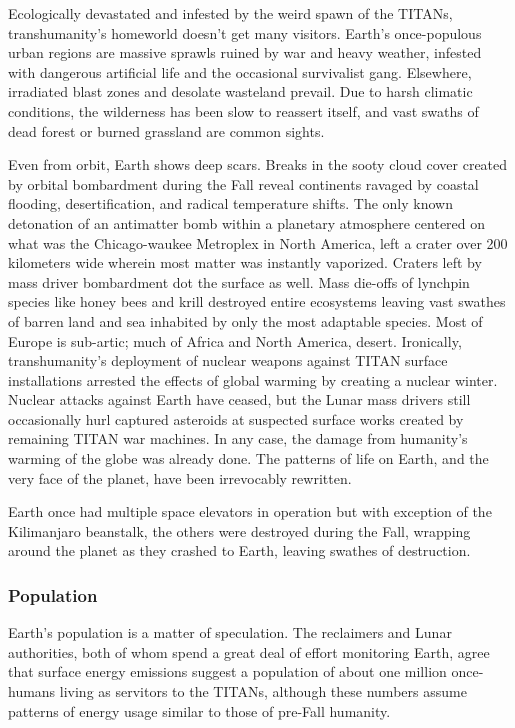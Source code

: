 Ecologically devastated and infested by the weird 
spawn of the TITANs, transhumanity's homeworld 
doesn't get many visitors. Earth's once-populous 
urban regions are massive sprawls ruined by war and 
heavy weather, infested with dangerous artificial life 
and the occasional survivalist gang. Elsewhere, irradiated
blast zones and desolate wasteland prevail. Due
to harsh climatic conditions, the wilderness has been 
slow to reassert itself, and vast swaths of dead forest 
or burned grassland are common sights.

Even from orbit, Earth shows deep scars. Breaks 
in the sooty cloud cover created by orbital bombardment
during the Fall reveal continents ravaged
by coastal flooding, desertification, and radical 
temperature shifts. The only known detonation 
of an antimatter bomb within a planetary atmosphere
centered on what was the Chicago-waukee
Metroplex in North America, left a crater over 200 
kilometers wide wherein most matter was instantly 
vaporized. Craters left by mass driver bombardment 
dot the surface as well. Mass die-offs of lynchpin 
species like honey bees and krill destroyed entire ecosystems
leaving vast swathes of barren land and sea
inhabited by only the most adaptable species. Most 
of Europe is sub-artic; much of Africa and North 
America, desert. Ironically, transhumanity's deployment
of nuclear weapons against TITAN surface
installations arrested the effects of global warming 
by creating a nuclear winter. Nuclear attacks against 
Earth have ceased, but the Lunar mass drivers still 
occasionally hurl captured asteroids at suspected 
surface works created by remaining TITAN war 
machines. In any case, the damage from humanity's 
warming of the globe was already done. The patterns 
of life on Earth, and the very face of the planet, have 
been irrevocably rewritten.

Earth once had multiple space elevators in operation
but with exception of the Kilimanjaro beanstalk,
the others were destroyed during the Fall, wrapping 
around the planet as they crashed to Earth, leaving 
swathes of destruction.

\subsubsection{Population}

Earth's population is a matter of speculation. The 
reclaimers and Lunar authorities, both of whom 
spend a great deal of effort monitoring Earth, agree 
that surface energy emissions suggest a population of 
about one million once-humans living as servitors to 
the TITANs, although these numbers assume patterns 
of energy usage similar to those of pre-Fall humanity.

